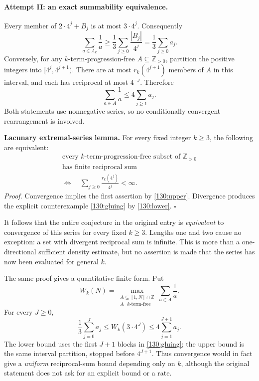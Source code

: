 \documentclass[11pt,a4paper]{article}
\newcommand{\Z}{\mathbb{Z}}
\newcommand{\A}{\mathbb{A}}
\numberwithin{equation}{section}
\begin{document}
\paragraph{Attempt II: an exact summability equivalence.}
Every member of $2\cdot4^j+B_j$ is at most $3\cdot4^j$.  Consequently
\begin{equation}\label{130:lower}
 \sum_{a\in A_k}\frac1a
 \geq\frac13\sum_{j\geq0}\frac{|B_j|}{4^j}
 =\frac13\sum_{j\geq0}a_j.
\end{equation}
Conversely, for any $k$-term-progression-free $A\subseteq\Z_{>0}$,
partition the positive integers into $[4^j,4^{j+1})$.  There are at
most $r_k(4^{j+1})$ members of $A$ in this interval, and each has
reciprocal at most $4^{-j}$.  Therefore
\begin{equation}\label{130:upper}
 \sum_{a\in A}\frac1a\leq4\sum_{j\geq1}a_j.
\end{equation}
Both statements use nonnegative series, so no conditionally convergent
rearrangement is involved.

\textbf{Lacunary extremal-series lemma.}
For every fixed integer $k\geq3$, the following are equivalent:
\[
 \begin{gathered}
 \text{every $k$-term-progression-free subset of $\Z_{>0}$}\\
 \text{has finite reciprocal sum}\\[2pt]
 \Longleftrightarrow\quad
 \sum_{j\geq0}\frac{r_k(4^j)}{4^j}<\infty.
 \end{gathered}
\]
\emph{Proof.} Convergence implies the first assertion by
\eqref{130:upper}.  Divergence produces the explicit counterexample
\eqref{130:gluing} by \eqref{130:lower}. \hfill$\square$

It follows that the entire conjecture in the original entry is
\emph{equivalent} to convergence of this series for every fixed
$k\geq3$.  Lengths one and two cause no exception: a set with divergent
reciprocal sum is infinite.  This is more than a one-directional
sufficient density estimate, but no assertion is made that the
series has now been evaluated for general $k$.

The same proof gives a quantitative finite form.  Put
\[
 W_k(N)=\max_{\substack{A\subseteq[1,N]\cap\Z\\A\text{ $k$-term-free}}}
          \sum_{a\in A}\frac1a.
\]
For every $J\geq0$,
\begin{equation}\label{130:finite}
 \frac13\sum_{j=0}^{J}a_j
 \leq W_k(3\cdot4^J)
 \leq4\sum_{j=1}^{J+1}a_j.
\end{equation}
The lower bound uses the first $J+1$ blocks in \eqref{130:gluing}; the
upper bound is the same interval partition, stopped before $4^{J+1}$.
Thus convergence would in fact give a \emph{uniform} reciprocal-sum
bound depending only on $k$, although the original statement does not
ask for an explicit bound or a rate.
\end{document}
